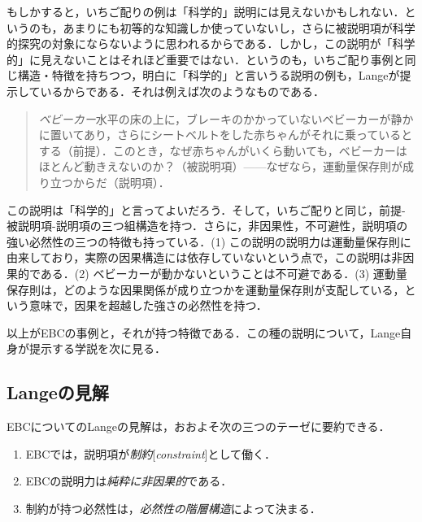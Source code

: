 \documentclass[dvipdfmx,twoside,11pt,uplatex]{jsarticle}
\newcommand{\myterm}[2]{{\emph{#1}}{[\emph{#2}]}}
\theoremstyle{definition}
\begin{document}
もしかすると，いちご配りの例は「科学的」説明には見えないかもしれない．というのも，あまりにも初等的な知識しか使っていないし，さらに被説明項が科学的探究の対象にならないように思われるからである．しかし，この説明が「科学的」に見えないことはそれほど重要ではない．というのも，いちご配り事例と同じ構造・特徴を持ちつつ，明白に「科学的」と言いうる説明の例も，Langeが提示しているからである．それは例えば次のようなものである．
\begin{quote}
    \emph{ベビーカー}\quad 水平の床の上に，ブレーキのかかっていないベビーカーが静かに置いてあり，さらにシートベルトをした赤ちゃんがそれに乗っているとする（前提）．このとき，なぜ赤ちゃんがいくら動いても，ベビーカーはほとんど動きえないのか？（被説明項）------なぜなら，運動量保存則が成り立つからだ（説明項）．
\end{quote}
この説明は「科学的」と言ってよいだろう．そして，いちご配りと同じ，前提-被説明項-説明項の三つ組構造を持つ．さらに，非因果性，不可避性，説明項の強い必然性の三つの特徴も持っている．(1) この説明の説明力は運動量保存則に由来しており，実際の因果構造には依存していないという点で，この説明は非因果的である．(2) ベビーカーが動かないということは不可避である．(3) 運動量保存則は，どのような因果関係が成り立つかを運動量保存則が支配している，という意味で，因果を超越した強さの必然性を持つ．

以上がEBCの事例と，それが持つ特徴である．この種の説明について，Lange自身が提示する学説を次に見る．


\subsection{Langeの見解}\label{langesview}
EBCについてのLangeの見解は，おおよそ次の三つのテーゼに要約できる．
\begin{enumerate}
\renewcommand{\labelenumi}{\Alph{enumi}.}
    \item EBCでは，説明項が\myterm{制約}{constraint}として働く．
    \item EBCの説明力は\emph{純粋に非因果的}である．
    \item 制約が持つ必然性は，\emph{必然性の階層構造}によって決まる．
\end{enumerate}
\end{document}
